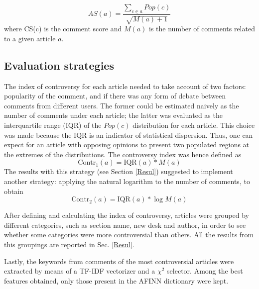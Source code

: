 \begin{equation}
\label{ASeq}
AS(a) = \frac{\sum_{c\in a} Pop(c)}{\sqrt{M(a)+1}}
\end{equation}
where CS(c) is the comment score and $M(a)$ is the number of comments related to a given article $a$.



\subsection{Evaluation strategies}

The index of controversy for each article needed to take account of two factors: popularity of the comment, and if there was any form of debate between comments from different users. The former could be estimated naively as the number of comments under each article; the latter was evaluated as the interquartile range (IQR) of the $Pop(c)$ distribution for each article. This choice was made because the IQR is an indicator of statistical dispersion. Thus, one can expect for an article with opposing opinions to present two populated regions at the extremes of the distributions. 
The controversy index was hence defined as 
\begin{equation}
\label{Str1}
\mbox{Contr}_1(a) = \mbox{IQR}(a) * M(a)
\end{equation}
The results with this strategy (see Section \ref{Resul}) suggested to implement another strategy: applying the natural logarithm to the number of comments, to obtain
\begin{equation}
\label{Str2}
\mbox{Contr}_2(a) = \mbox{IQR}(a) * \log{M(a)}
\end{equation}

After defining and calculating the index of controversy, articles were grouped by different categories, such as section name, new desk and author, in order to see whether some categories were more controversial than others. All the results from this groupings are reported in Sec. \ref{Resul}.

Lastly, the keywords from comments of the most controversial articles were extracted by means of a TF-IDF vectorizer and a $\chi^2$ selector. Among the best features obtained, only those present in the AFINN dictionary were kept.